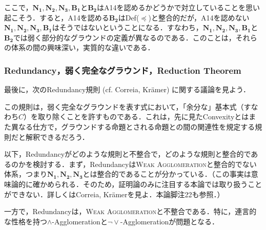 \documentclass[twoside,14Q,uplatex,dvipdfmx]{jsarticle}
\theoremstyle{definition}
\begin{document}
ここで，$\mathbf{N_{1}, N_{2}, N_{3}, B_{1}}$と$\mathbf{B_{2}}$はA14を認めるかどうかで対立していることを思い起こそう．すると，A14を認める$\mathbf{B_{2}}$はDef($\preceq$)と整合的だが，A14を認めない$\mathbf{N_{1}, N_{2}, N_{3}, B_{1}}$はそうではないということになる．すなわち，$\mathbf{N_{1}, N_{2}, N_{3}, B_{1}}$と$\mathbf{B_{2}}$では弱く部分的なグラウンドの定義が異なるのである．このことは，それらの体系の間の興味深い，実質的な違いである．
%
%
%
\subsubsection{Redundancy，弱く完全なグラウンド，Reduction Theorem}\label{redundancy}
最後に，次のRedundancy規則 (cf. Correia\cite{Correia2017}, Kr\"{a}mer\cite{Kramer2018,Kramer2021}) に関する議論を見よう．

\begin{prooftree}
\end{prooftree}

\noindent この規則は，弱く完全なグラウンドを表す式において，「余分な」基本式（すなわち$C$）を取り除くことを許すものである．これは，先に見たConvexityとはまた異なる仕方で，グラウンドする命題とされる命題との間の関連性を規定する規則だと解釈できるだろう．

以下，Redundancyがどのような規則と不整合で，どのような規則と整合的であるのかを検討する．まず，Redundancyは\textsc{Weak Agglomeration}と整合的でない体系，つまり$\mathbf{N_{1}}, \mathbf{N_{2}}, \mathbf{N_{3}}$とは整合的であることが分かっている．（この事実は意味論的に確かめられる．そのため，証明論のみに注目する本論では取り扱うことができない．詳しくはCorreia\cite[p.525]{Correia2017}, Kr\"{a}mer\cite[p.1671]{Kramer2021}を見よ．本論脚注22も参照．）

一方で，Redundancyは，\textsc{Weak Agglomeration}と不整合である．特に，連言的な性格を持つ$\land$-Agglomerationと$\lnot\lor$-Agglomerationが問題となる．
\end{document}
